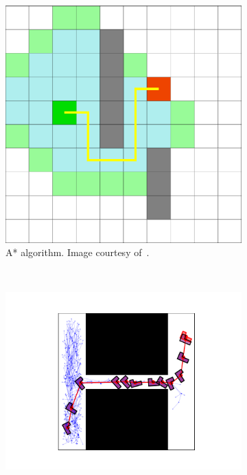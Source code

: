 \documentclass{ctuthesis}
\begin{document}
\begin{figure}
  \centering
  \begin{subfigure}[b]{0.36\textwidth}
      \includegraphics[width=\textwidth]{figChap2/A-star-on-grid-map.png}
      \caption{A* algorithm.
        Image courtesy of~\cite{Xie2022Astarfoto}.}
      \label{fig:Astargrid}
  \end{subfigure}
  ~ %
  \begin{subfigure}[b]{0.61\textwidth}
      \includegraphics[width=\textwidth]{figChap1/narrow_passage.pdf}

\end{subfigure}
\end{figure}
\end{document}
